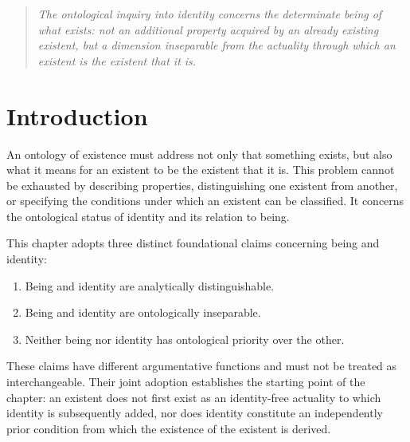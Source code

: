 
\def\CurrentChapterID{VS.B01.P01.C01}
\def\CurrentChapterTitle{Identity}



\begin{quote}
\textit{
The ontological inquiry into identity concerns the
determinate being of what exists: not an additional
property acquired by an already existing existent,
but a dimension inseparable from the actuality
through which an existent is the existent that it is.
}
\end{quote}



\section*{Introduction}

An ontology of existence must address not only that
something exists, but also what it means for an existent
to be the existent that it is. This problem cannot be
exhausted by describing properties, distinguishing one
existent from another, or specifying the conditions under
which an existent can be classified. It concerns the
ontological status of identity and its relation to being.

This chapter adopts three distinct foundational claims
concerning being and identity:

\begin{enumerate}
    \item Being and identity are analytically distinguishable.
    \item Being and identity are ontologically inseparable.
    \item Neither being nor identity has ontological priority
    over the other.
\end{enumerate}

These claims have different argumentative functions and
must not be treated as interchangeable. Their joint
adoption establishes the starting point of the chapter:
an existent does not first exist as an identity-free
actuality to which identity is subsequently added, nor
does identity constitute an independently prior condition
from which the existence of the existent is derived.

